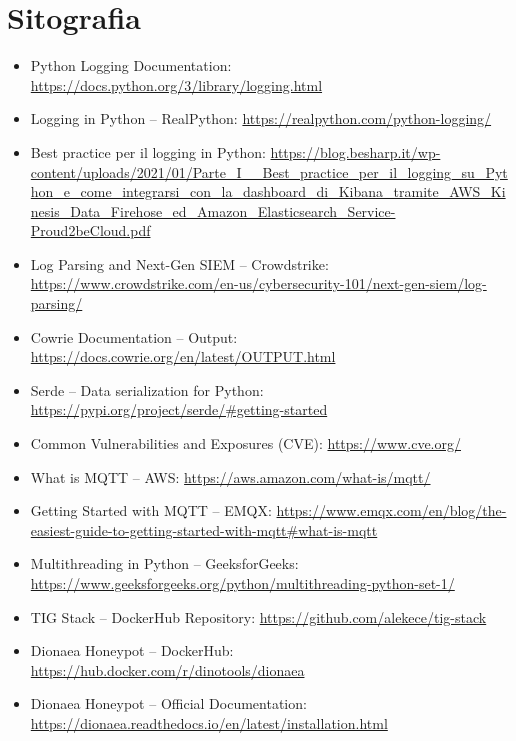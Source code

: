 \chapter{Sitografia}
\label{cap:webliography}

\begin{itemize}
    \item Python Logging Documentation: \url{https://docs.python.org/3/library/logging.html}
    \item Logging in Python – RealPython: \url{https://realpython.com/python-logging/}
    \item Best practice per il logging in Python: \url{https://blog.besharp.it/wp-content/uploads/2021/01/Parte_I__Best_practice_per_il_logging_su_Python_e_come_integrarsi_con_la_dashboard_di_Kibana_tramite_AWS_Kinesis_Data_Firehose_ed_Amazon_Elasticsearch_Service-Proud2beCloud.pdf}
    \item Log Parsing and Next-Gen SIEM – Crowdstrike: \url{https://www.crowdstrike.com/en-us/cybersecurity-101/next-gen-siem/log-parsing/}
    \item Cowrie Documentation – Output: \url{https://docs.cowrie.org/en/latest/OUTPUT.html}
    \item Serde – Data serialization for Python: \url{https://pypi.org/project/serde/#getting-started}
    \item Common Vulnerabilities and Exposures (CVE): \url{https://www.cve.org/}
    \item What is MQTT – AWS: \url{https://aws.amazon.com/what-is/mqtt/}
    \item Getting Started with MQTT – EMQX: \url{https://www.emqx.com/en/blog/the-easiest-guide-to-getting-started-with-mqtt#what-is-mqtt}
    \item Multithreading in Python – GeeksforGeeks: \url{https://www.geeksforgeeks.org/python/multithreading-python-set-1/}
    \item TIG Stack – DockerHub Repository: \url{https://github.com/alekece/tig-stack}
    \item Dionaea Honeypot – DockerHub: \url{https://hub.docker.com/r/dinotools/dionaea}
    \item Dionaea Honeypot – Official Documentation: \url{https://dionaea.readthedocs.io/en/latest/installation.html}
\end{itemize}